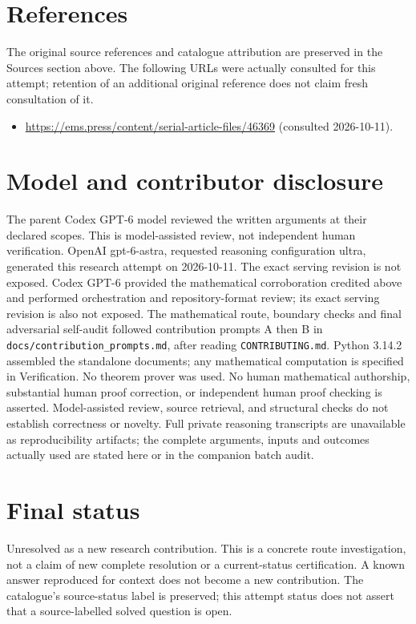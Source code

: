 \documentclass[11pt]{article}
\begin{document}
\section{References}
The original source references and catalogue attribution are preserved in the
Sources section above. The following URLs were actually consulted for this attempt;
retention of an additional original reference does not claim fresh consultation of it.
\begin{itemize}
\item \url{https://ems.press/content/serial-article-files/46369} (consulted 2026-10-11). 
\end{itemize}
\section{Model and contributor disclosure}
The parent Codex GPT-6 model reviewed the written arguments at their declared scopes. This is model-assisted review, not independent human verification.
OpenAI gpt-6-astra, requested reasoning configuration ultra, generated this research
attempt on 2026-10-11. The exact serving revision is not exposed. Codex GPT-6
provided the mathematical corroboration credited above and performed orchestration and repository-format review; its exact serving revision
is also not exposed. The mathematical route, boundary checks and final adversarial
self-audit followed contribution prompts A then B in
\texttt{docs/contribution\_prompts.md}, after reading \texttt{CONTRIBUTING.md}.
Python 3.14.2 assembled the standalone documents; any mathematical computation is
specified in Verification. No theorem prover was used. No human mathematical
authorship, substantial human proof correction, or independent human proof checking
is asserted. Model-assisted review, source retrieval, and structural checks do not
establish correctness or novelty. Full private reasoning transcripts are unavailable
as reproducibility artifacts; the complete arguments, inputs and outcomes actually
used are stated here or in the companion batch audit.
\section{Final status}
Unresolved as a new research contribution. This is a concrete route investigation,
not a claim of new complete resolution or a current-status certification. A known
answer reproduced for context does not become a new contribution. The catalogue's
source-status label is preserved; this attempt status does not assert that a
source-labelled solved question is open.
\end{document}
